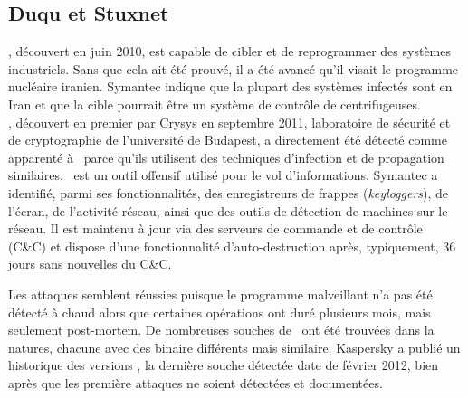 \subsection{Duqu et Stuxnet}
\stux, découvert en juin 2010, est capable de cibler et de reprogrammer des systèmes industriels.
Sans que cela ait été prouvé, il a été avancé qu'il visait le programme nucléaire iranien. 
Symantec \cite{SymantecStux2011} indique que la plupart des systèmes infectés sont en Iran et que la cible pourrait être un système de contrôle de centrifugeuses.
\\

\duqu, découvert en premier par Crysys \cite{CrysysDuquStuxnet} en septembre 2011, laboratoire de sécurité et de cryptographie de l'université de Budapest, a directement été détecté comme apparenté à \stux\ parce qu'ils utilisent des techniques d'infection et de propagation similaires.
\duqu\ est un outil offensif utilisé pour le vol d'informations. Symantec \cite{SymantecDuqu2011} a identifié, parmi ses fonctionnalités, des enregistreurs de frappes (\emph{keyloggers}), de l'écran, de l'activité réseau, ainsi que des outils de détection de machines sur le réseau.
Il est maintenu à jour via des serveurs de commande et de contrôle (C\&C) et dispose d'une fonctionnalité d'auto-destruction après, typiquement, 36 jours sans nouvelles du C\&C.

Les attaques semblent réussies puisque le programme malveillant n'a pas été détecté à chaud alors que certaines opérations ont duré plusieurs mois, mais seulement post-mortem. De nombreuses souches de \duqu\ ont été trouvées dans la natures, chacune avec des binaire différents mais similaire. Kaspersky a publié un historique des versions \cite{KaspDuqu10}, la dernière souche détectée date de février 2012, bien après que les première attaques ne soient détectées et documentées.

